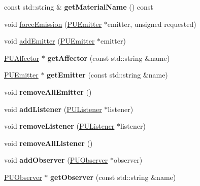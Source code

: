 \begin{DoxyCompactItemize}
const std\+::string \& {\bfseries get\+Material\+Name} () const
\item 
void \hyperlink{classPUParticleSystem3D_abc2757bc7cd26511bdce5d0dd85f0d8a}{force\+Emission} (\hyperlink{classPUEmitter}{P\+U\+Emitter} $\ast$emitter, unsigned requested)
\item 
void \hyperlink{classPUParticleSystem3D_aa317775b911d27623d6b7f61733f6a32}{add\+Emitter} (\hyperlink{classPUEmitter}{P\+U\+Emitter} $\ast$emitter)
\item 
\mbox{\label{classPUParticleSystem3D_a6746af8645d9d0917186a50a6ef54c65}} 
\hyperlink{classPUAffector}{P\+U\+Affector} $\ast$ {\bfseries get\+Affector} (const std\+::string \&name)
\item 
\mbox{\label{classPUParticleSystem3D_ab0a27d6ba25e9f4069eb5f44f2616210}} 
\hyperlink{classPUEmitter}{P\+U\+Emitter} $\ast$ {\bfseries get\+Emitter} (const std\+::string \&name)
\item 
\mbox{\label{classPUParticleSystem3D_afa5e3778dfd6efa7f7d4d47906d416bc}} 
void {\bfseries remove\+All\+Emitter} ()
\item 
\mbox{\label{classPUParticleSystem3D_a98a118ebe14fbd13b75fa288e36e9c54}} 
void {\bfseries add\+Listener} (\hyperlink{classPUListener}{P\+U\+Listener} $\ast$listener)
\item 
\mbox{\label{classPUParticleSystem3D_a2187a0d7c33077f2a2c044fb52a27864}} 
void {\bfseries remove\+Listener} (\hyperlink{classPUListener}{P\+U\+Listener} $\ast$listener)
\item 
\mbox{\label{classPUParticleSystem3D_a081cd49af03841b7c5b3ef66e23540ef}} 
void {\bfseries remove\+All\+Listener} ()
\item 
\mbox{\label{classPUParticleSystem3D_a9ddd4a5cc1e7500811bb62ab62d71545}} 
void {\bfseries add\+Observer} (\hyperlink{classPUObserver}{P\+U\+Observer} $\ast$observer)
\item 
\mbox{\label{classPUParticleSystem3D_a7e9f2cde36140d914ea5c835b5d92d05}} 
\hyperlink{classPUObserver}{P\+U\+Observer} $\ast$ {\bfseries get\+Observer} (const std\+::string \&name)

\end{DoxyCompactItemize}
